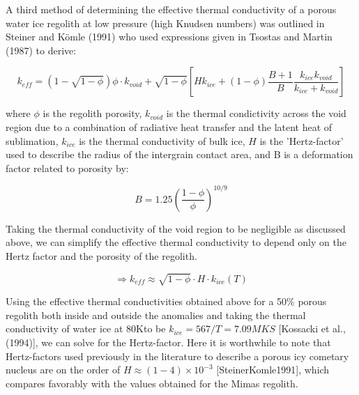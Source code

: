 \documentclass[11pt]{article} %
\begin{document}
	A third method of determining the effective thermal conductivity of a porous water ice regolith at low pressure (high Knudsen numbers) was outlined in Steiner and K\"{o}mle (1991) who used expressions given in Tsostas and Martin (1987) to derive:

	\begin{equation}
	k_{eff} = (1-\sqrt{1-\phi})\phi \cdot k_{void} + \sqrt{1-\phi}[H k_{ice}+(1-\phi)\frac{B+1}{B}\frac{k_{ice}k_{void}}{k_{ice}+k_{void}}]
	\end{equation}
	
	where $\phi$ is the regolith porosity, $k_{void}$ is the thermal condictivity across the void region due to a combination of radiative heat transfer and the latent heat of sublimation, $k_{ice}$ is the thermal conductivity of bulk ice, $H$ is the 'Hertz-factor' used to describe the radius of the intergrain contact area, and B is a deformation factor related to porosity by:
	
	\begin{equation}
	B = 1.25 ( \frac{1-\phi}{\phi} )^{10/9}
	\end{equation}
	
	

	Taking the thermal conductivity of the void region to be negligible as discussed above, we can simplify the effective thermal conductivity to depend only on the Hertz factor and the porosity of the regolith.
	
	\begin{equation}
	\Rightarrow k_{eff} \approx \sqrt{1-\phi}\cdot H \cdot k_{ice}(T)
	\end{equation}
	
	Using the effective thermal conductivities obtained above for a 50\% porous regolith both inside and outside the anomalies and taking the thermal conductivity of water ice at 80Kto be $k_{ice} = 567/T = 7.09 MKS$ [Kossacki et al., (1994)], we can solve for the Hertz-factor. Here it is worthwhile to note that Hertz-factors used previously in the literature to describe a porous icy cometary nucleus are on the order of  $H  \approx (1 - 4) \times10^{-3}$ [SteinerKomle1991], which compares favorably with the values obtained for the Mimas regolith. 
	
\end{document}
